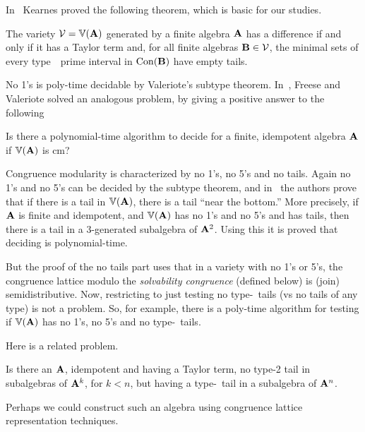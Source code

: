 In~\cite{MR1358491} 
Kearnes proved the following theorem, which is basic for our studies.

\begin{theorem}\label{thm:KearnesThm}
The variety $\mathcal{V} = \operatorname{\mathbb{V}}(\mathbf{A})$ generated by a 
finite algebra $\mathbf{A}$ has a difference  if and only if
it has a Taylor term and, for all finite algebras 
$\mathbf{B} \in \mathcal{V}$,
the minimal sets of every type~\atyp\ prime interval in
$\operatorname{Con}(\mathbf{B})$ have empty tails.
\end{theorem}




No 1's is poly-time decidable by Valeriote's subtype theorem.
In~\cite{Freese:2009}, Freese and Valeriote solved an 
analogous problem, by giving a positive answer to the following
\begin{prob}
  \label{prob:2}
  Is there a polynomial-time algorithm to decide for a finite,
  idempotent algebra $\mathbf{A}$ if $\operatorname{\mathbb{V}}(\mathbf{A})$ is \ac{cm}?
\end{prob}

Congruence modularity is characterized by no 1's, no 5's and no tails.
Again no 1's and no 5's can be decided by the subtype theorem,
and in~\cite{Freese:2009} the authors prove that if there is
a tail in $\operatorname{\mathbb{V}}(\mathbf{A})$, there is a tail ``near the bottom.''
More precisely, if $\mathbf{A}$ is finite and idempotent, 
and $\operatorname{\mathbb{V}}(\mathbf{A})$ has no
1's and no 5's and has tails, then there is a tail in 
a 3-generated subalgebra of $\mathbf{A}^2$.
Using this it is proved that deciding \cm is polynomial-time.

But the proof of the no tails part uses that in a variety with 
no 1's or 5's, the congruence lattice modulo 
the {\it solvability congruence} (defined below)
is (join) semidistributive.
Now, restricting to just testing no type-\atyp\ tails 
(vs no tails of any type) is
not a problem. So, for example, there is a poly-time 
algorithm for testing if
$\operatorname{\mathbb{V}}(\mathbf{A})$ has no 1's, no 5's and no type-\atyp\ tails.  

Here is a related problem.
\begin{prob}
  \label{prob:3}
  Is there an $\mathbf{A}$, idempotent and having a Taylor term, 
  no type-2 tail in 
  subalgebras of $\mathbf{A}^k$, for $k < n$, but having a type-\atyp\ 
  tail in a subalgebra
  of $\mathbf{A}^n$. 
\end{prob}
Perhaps we could construct such an algebra using congruence lattice
representation techniques. 


